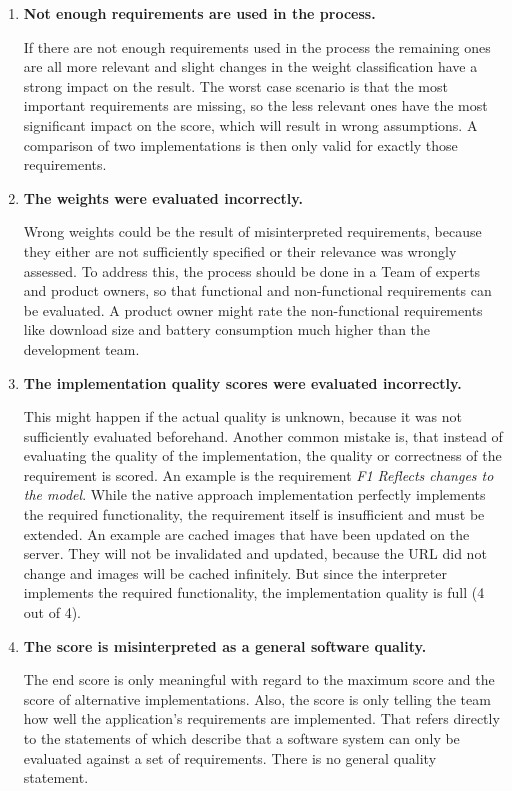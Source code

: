 \begin{enumerate}
	\item \textbf{Not enough requirements are used in the process.}
	
	If there are not enough requirements used in the process the remaining ones are all more relevant and slight changes in the weight classification have a strong impact on the result.
	The worst case scenario is that the most important requirements are missing, so the less relevant ones have the most significant impact on the score, which will result in wrong assumptions.
	A comparison of two implementations is then only valid for exactly those requirements.
	
	\item \textbf{The weights were evaluated incorrectly.}
	
	Wrong weights could be the result of misinterpreted requirements, because they either are not sufficiently specified or their relevance was wrongly assessed.
	To address this, the process should be done in a Team of experts and product owners, so that functional and non-functional requirements can be evaluated.
	A product owner might rate the non-functional requirements like download size and battery consumption much higher than the development team.
	
	\item \textbf{The implementation quality scores were evaluated incorrectly.}
	
	This might happen if the actual quality is unknown, because it was not sufficiently evaluated beforehand.
	Another common mistake is, that instead of evaluating the quality of the implementation, the quality or correctness of the requirement is scored.
	An example is the requirement \textit{F1 Reflects changes to the model}.
	While the native approach implementation perfectly implements the required functionality, the requirement itself is insufficient and must be extended.
	An example are cached images that have been updated on the server.
	They will not be invalidated and updated, because the \ac{URL} did not change and images will be cached infinitely.
	But since the interpreter implements the required functionality, the implementation quality is full (4 out of 4).
	
	\item \textbf{The score is misinterpreted as a general software quality.}
	
	The end score is only meaningful with regard to the maximum score and the score of alternative implementations.
	Also, the score is only telling the team how well the application's requirements are implemented.
	That refers directly to the statements of \cite{klein_evaluating_2001} which describe that a software system can only be evaluated against a set of requirements.
	There is no general quality statement.
	

\end{enumerate}
